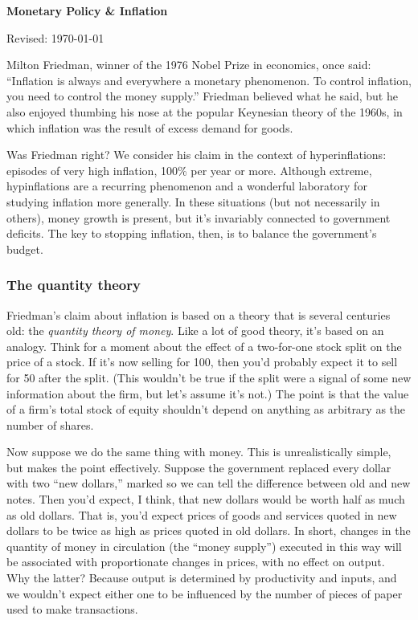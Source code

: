 \documentclass[letterpaper,12pt]{article}
\def\HeadName{Inflation}
\begin{document}
\thispagestyle{empty}%
\Head

\centerline{\large \bf Monetary Policy \& \HeadName}%
\centerline{Revised: \today}

\bigskip
Milton Friedman, winner of the 1976 Nobel Prize in economics, once
said: ``Inflation is always and everywhere a monetary phenomenon.
To control inflation, you need to control the money supply.''
Friedman believed what he said, but he also enjoyed
thumbing his nose at the popular Keynesian theory of the 1960s,
in which inflation was the result of excess demand for goods.

Was Friedman right?
We consider his claim in the context of hyperinflations:
episodes of very high inflation, 100\% per year or more.
Although extreme, hypinflations are a recurring phenomenon
and a wonderful laboratory for
studying inflation more generally.
In these situations (but not necessarily in others),
money growth is present,
but it's invariably connected to government deficits.
The key to stopping inflation, then, is to
balance the government's budget.


\subsubsection*{The quantity theory}

Friedman's claim about inflation is based on a theory that is
several centuries old: the {\it quantity theory of
money\/}. Like a lot of good theory, it's based on an analogy. Think
for a moment about the effect of a two-for-one stock split on the
price of a stock. If it's now selling for 100, then you'd probably
expect it to sell for 50 after the split. (This wouldn't be true if
the split were a signal of some new information about the firm,
but let's assume it's not.) The point is that the value of a firm's
total stock of equity shouldn't depend on anything as arbitrary as
the number of shares.

Now suppose we do the same thing with money.  This is
unrealistically simple, but makes the point effectively. Suppose the
government replaced every dollar with two ``new dollars,''
marked so we can tell the difference between old and new notes. Then
you'd expect, I think, that new dollars would be worth half as much
as old dollars. That is, you'd expect prices of goods and services
quoted in new dollars to be twice as high as prices quoted in old
dollars. In short, changes in the quantity of money in circulation
(the ``money supply'') executed in this way will be associated with
proportionate changes in prices, with no effect on output.  Why the
latter? Because output is determined by productivity and inputs, and
we wouldn't expect either one to be influenced by the number of
pieces of paper used to make transactions.
\end{document}
